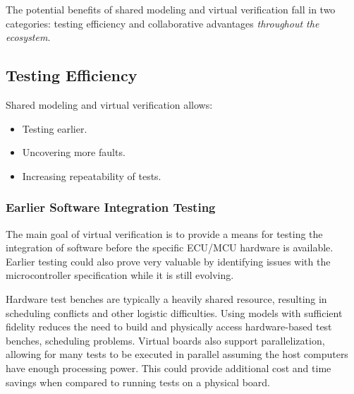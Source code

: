 The potential benefits of shared modeling and virtual verification fall in two categories:
testing efficiency and collaborative advantages \emph{throughout the ecosystem}.

\subsection{Testing Efficiency}
Shared modeling and virtual verification allows:

\begin{itemize}
    \item Testing earlier.
    \item Uncovering more faults.
    \item Increasing repeatability of tests.
\end{itemize}

\subsubsection*{Earlier Software Integration Testing}
The main goal of virtual verification is to provide a means for testing the integration of software before the specific ECU/MCU hardware is available.
Earlier testing could also prove very valuable by identifying issues with the microcontroller specification while it is still evolving.

Hardware test benches are typically a heavily shared resource, resulting in scheduling conflicts and other logistic difficulties.
Using models with sufficient fidelity
reduces the need to build and physically access hardware-based test benches,
 scheduling problems.
Virtual boards also support parallelization, allowing for many tests to be executed in parallel assuming the host computers have enough processing power.
This could provide additional cost and time savings when compared to running tests on a physical board.

